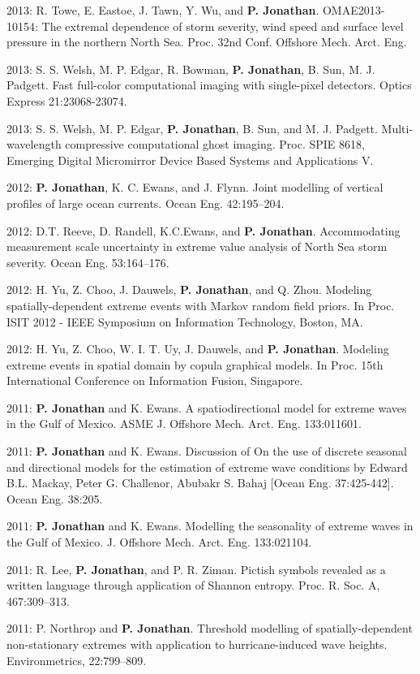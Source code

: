 \documentclass[11pt,a4paper]{moderncv}
\begin{document}
2013: R. Towe, E. Eastoe, J. Tawn, Y. Wu, and \textbf{P. Jonathan}. OMAE2013-10154: The extremal dependence of storm severity, wind speed and surface level pressure in the northern North Sea. Proc. 32nd Conf. Offshore Mech. Arct. Eng.

2013: S. S. Welsh, M. P. Edgar, R. Bowman, \textbf{P. Jonathan}, B. Sun, M. J. Padgett. Fast full-color computational imaging with single-pixel detectors. Optics Express 21:23068-23074.

2013: S. S. Welsh, M. P. Edgar, \textbf{P. Jonathan}, B. Sun, and M. J. Padgett. Multi-wavelength compressive computational ghost imaging. Proc. SPIE 8618, Emerging Digital Micromirror Device Based Systems and Applications V.

2012: \textbf{P. Jonathan}, K. C. Ewans, and J. Flynn. Joint modelling of vertical profiles of large ocean currents. Ocean Eng. 42:195--204.

2012: D.T. Reeve, D. Randell, K.C.Ewans, and \textbf{P. Jonathan}. Accommodating measurement scale uncertainty in extreme value analysis of North Sea storm severity. Ocean Eng. 53:164--176.

2012: H. Yu, Z. Choo, J. Dauwels, \textbf{P. Jonathan}, and Q. Zhou. Modeling spatially-dependent extreme events with Markov random field priors. In Proc. ISIT 2012 - IEEE Symposium on Information Technology, Boston, MA.

2012: H. Yu, Z. Choo, W. I. T. Uy, J. Dauwels, and \textbf{P. Jonathan}. Modeling extreme events in spatial domain by copula graphical models. In Proc. 15th International Conference on Information Fusion, Singapore.

2011: \textbf{P. Jonathan} and K. Ewans. A spatiodirectional model for extreme waves in the Gulf of Mexico. ASME J. Offshore Mech. Arct. Eng. 133:011601.

2011: \textbf{P. Jonathan} and K. Ewans. Discussion of On the use of discrete seasonal and directional models for the estimation of extreme wave conditions by Edward B.L. Mackay, Peter G. Challenor, Abubakr S. Bahaj [Ocean Eng. 37:425-442]. Ocean Eng. 38:205.

2011: \textbf{P. Jonathan} and K. Ewans. Modelling the seasonality of extreme waves in the Gulf of Mexico. J. Offshore Mech. Arct. Eng. 133:021104.

2011: R. Lee, \textbf{P. Jonathan}, and P. R. Ziman. Pictish symbols revealed as a written language through application of Shannon entropy. Proc. R. Soc. A, 467:309--313.

2011: P. Northrop and \textbf{P. Jonathan}. Threshold modelling of spatially-dependent non-stationary extremes with application to hurricane-induced wave heights. Environmetrics, 22:799--809.
\end{document}

